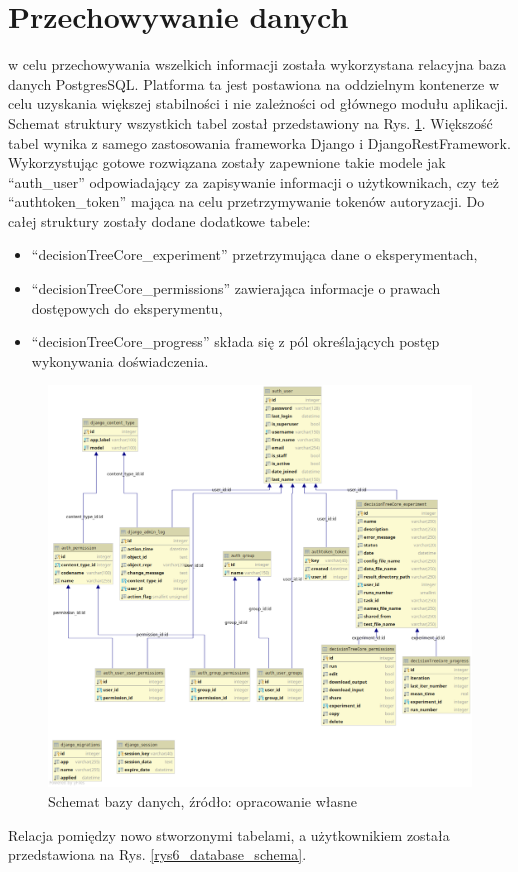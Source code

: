 \section{Przechowywanie danych}
w celu przechowywania wszelkich informacji została wykorzystana relacyjna baza danych PostgresSQL. Platforma ta jest postawiona na oddzielnym kontenerze w celu uzyskania większej stabilności i nie zależności od głównego modułu aplikacji. Schemat struktury wszystkich tabel został przedstawiony na Rys. \ref{rys5_database_schema}. Większość tabel wynika z samego zastosowania frameworka Django i DjangoRestFramework. Wykorzystując gotowe rozwiązana zostały zapewnione takie modele jak \enquote{auth\_user} odpowiadający za zapisywanie informacji o użytkownikach, czy też \enquote{authtoken\_token} mająca na celu przetrzymywanie tokenów autoryzacji. Do całej struktury zostały dodane dodatkowe tabele:
\begin{itemize}
	\item \enquote{decisionTreeCore\_experiment} przetrzymująca dane o eksperymentach,  
	\item \enquote{decisionTreeCore\_permissions} zawierająca informacje o prawach dostępowych do eksperymentu,
	\item \enquote{decisionTreeCore\_progress} składa się z pól określających postęp wykonywania doświadczenia.
\end{itemize}
\begin{figure}[htb]
	\centering
	\includegraphics[angle=270, width=16cm]{grafika/database_schema.eps}
	\caption{Schemat bazy danych, źródło: opracowanie własne}
	\label{rys5_database_schema}
\end{figure}
Relacja pomiędzy nowo stworzonymi tabelami, a użytkownikiem została przedstawiona na Rys. \ref{rys6_database_schema}. 

